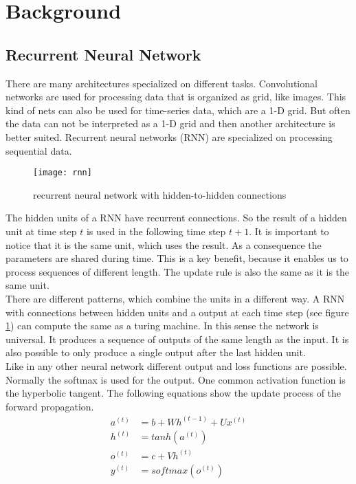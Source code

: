 \section{Background}
\label{sec:background}

\subsection{Recurrent Neural Network}
\label{sec:rnn}
There are many architectures specialized on different tasks. Convolutional networks are used for processing data that is organized as grid, like images. This kind of nets can also be used for time-series data, which are a 1-D grid. But often the data can not be interpreted as a 1-D grid and then another architecture is better suited. Recurrent neural networks (RNN) are specialized on processing sequential data.\\
\begin{figure}[thb]
	\caption{recurrent neural network with hidden-to-hidden connections \cite[p. 373]{DeepLearning}}
	\texttt{[image: rnn]}
	\label{fig:rnn}
\end{figure}
The hidden units of a RNN have recurrent connections. So the result of a hidden unit at time step $t$ is used in the following time step $t+1$. It is important to notice that it is the same unit, which uses the result. As a consequence the parameters are shared during time. This is a key benefit, because it enables us to process sequences of different length. The update rule is also the same as it is the same unit.\\
There are different patterns, which combine the units in a different way. A RNN with connections between hidden units and a output at each time step (see figure \ref{fig:rnn}) can compute the same as a turing machine. In this sense the network is universal. It produces a sequence of outputs of the same length as the input. It is also possible to only produce a single output after the last hidden unit.\\
Like in any other neural network different output and loss functions are possible. Normally the softmax is used for the output. One common activation function is the hyperbolic tangent. The following equations show the update process of the forward propagation.
\begin{align}
a^{(t)} &= b + Wh^{(t-1)} + Ux^{(t)} \\
h^{(t)} &= tanh(a^{(t)}) \\
o^{(t)} &= c + Vh^{(t)} \\
y^{(t)} &= softmax(o^{(t)})
\end{align}
